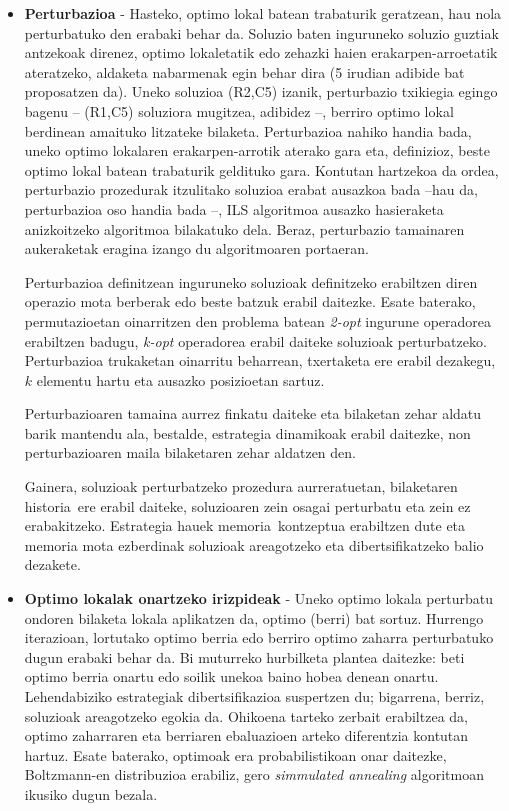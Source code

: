 \documentclass[eu]{ifirak}\usepackage[]{graphicx}\usepackage[]{color}
\newcommand{\zkk}{\guillemotleft}
\newcommand{\skk}{\guillemotright}
\begin{document}
\begin{itemize}
\item \textbf{Perturbazioa} - Hasteko, optimo lokal batean trabaturik geratzean, hau nola perturbatuko den erabaki behar da. Soluzio baten inguruneko soluzio guztiak antzekoak direnez, optimo lokaletatik edo zehazki haien erakarpen-arroetatik ateratzeko, aldaketa nabarmenak egin behar dira (5 irudian adibide bat proposatzen da). Uneko soluzioa (R2,C5) izanik, perturbazio txikiegia egingo bagenu -- (R1,C5) soluziora mugitzea, adibidez --, berriro optimo lokal berdinean amaituko litzateke bilaketa. Perturbazioa nahiko handia bada, uneko optimo lokalaren erakarpen-arrotik aterako gara eta, definizioz, beste optimo lokal batean trabaturik geldituko gara. Kontutan hartzekoa da ordea, perturbazio prozedurak itzulitako soluzioa erabat ausazkoa bada --hau da, perturbazioa oso handia bada --, ILS algoritmoa ausazko hasieraketa anizkoitzeko algoritmoa bilakatuko dela. Beraz, perturbazio tamainaren aukeraketak eragina izango du algoritmoaren portaeran.

Perturbazioa definitzean inguruneko soluzioak definitzeko erabiltzen diren operazio mota berberak edo beste batzuk erabil daitezke. Esate baterako, permutazioetan oinarritzen den problema batean \textit{2-opt} ingurune operadorea erabiltzen badugu, \textit{k-opt} operadorea erabil daiteke soluzioak perturbatzeko. Perturbazioa trukaketan oinarritu beharrean, txertaketa ere erabil dezakegu, $k$ elementu hartu eta ausazko posizioetan sartuz. 

Perturbazioaren tamaina aurrez finkatu daiteke eta bilaketan zehar aldatu barik mantendu ala, bestalde, estrategia dinamikoak erabil daitezke, non perturbazioaren maila bilaketaren zehar aldatzen den.

Gainera, soluzioak perturbatzeko prozedura aurreratuetan, bilaketaren \zkk historia\skk\ ere erabil daiteke, soluzioaren zein osagai perturbatu eta zein ez erabakitzeko. Estrategia hauek \zkk memoria\skk\ kontzeptua erabiltzen dute eta memoria mota ezberdinak soluzioak areagotzeko eta dibertsifikatzeko balio dezakete.

\item \textbf{Optimo lokalak onartzeko irizpideak} - Uneko optimo lokala perturbatu ondoren bilaketa lokala aplikatzen da, optimo (berri) bat sortuz. Hurrengo iterazioan, lortutako optimo berria edo berriro optimo zaharra perturbatuko dugun erabaki behar da. Bi muturreko hurbilketa plantea daitezke: beti optimo berria onartu edo soilik unekoa baino hobea denean onartu. Lehendabiziko estrategiak dibertsifikazioa suspertzen du; bigarrena, berriz, soluzioak areagotzeko egokia da. Ohikoena tarteko zerbait erabiltzea da, optimo zaharraren eta berriaren ebaluazioen arteko  diferentzia kontutan hartuz. Esate baterako, optimoak era probabilistikoan onar daitezke, Boltzmann-en distribuzioa erabiliz, gero \textit{simmulated annealing} algoritmoan ikusiko dugun bezala. 
\end{itemize}
\end{document}
